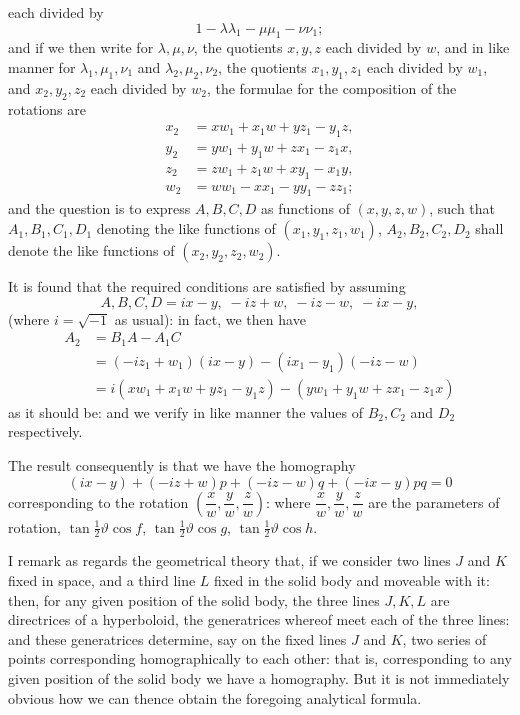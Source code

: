 \documentclass[11pt,a4paper]{article}
\begin{document}

each divided by
\[
1 - \lambda\lambda_{1} - \mu\mu_{1} - \nu\nu_{1};
\]
and if we then write for $\lambda, \mu, \nu$, the quotients $x, y, z$ each divided by $w$, and in like manner for $\lambda_{1}, \mu_{1}, \nu_{1}$ and $\lambda_{2}, \mu_{2}, \nu_{2}$, the quotients $x_{1}, y_{1}, z_{1}$ each divided by $w_{1}$, and $x_{2}, y_{2}, z_{2}$ each divided by $w_{2}$, the formulae for the composition of the rotations are
\[
\begin{aligned}
x_{2} &= xw_{1} + x_{1}w + yz_{1} - y_{1}z,\\
y_{2} &= yw_{1} + y_{1}w + zx_{1} - z_{1}x,\\
z_{2} &= zw_{1} + z_{1}w + xy_{1} - x_{1}y,\\
w_{2} &= ww_{1} - xx_{1} - yy_{1} - zz_{1};
\end{aligned}
\]
and the question is to express $A, B, C, D$ as functions of $(x, y, z, w)$, such that $A_{1}, B_{1}, C_{1}, D_{1}$ denoting the like functions of $(x_{1}, y_{1}, z_{1}, w_{1})$, $A_{2}, B_{2}, C_{2}, D_{2}$ shall denote the like functions of $(x_{2}, y_{2}, z_{2}, w_{2})$.

It is found that the required conditions are satisfied by assuming
\[
A, B, C, D = ix - y,\; -iz + w,\; -iz - w,\; -ix - y,
\]
(where $i = \sqrt{-1}$ as usual): in fact, we then have
\[
\begin{aligned}
A_{2} &= B_{1}A - A_{1}C\\
&= (-iz_{1} + w_{1})(ix - y) - (ix_{1} - y_{1})(-iz - w)\\
&= i(xw_{1} + x_{1}w + yz_{1} - y_{1}z) - (yw_{1} + y_{1}w + zx_{1} - z_{1}x)
\end{aligned}
\]
as it should be: and we verify in like manner the values of $B_{2}, C_{2}$ and $D_{2}$ respectively.

The result consequently is that we have the homography
\[
(ix - y) + (-iz + w)p + (-iz - w)q + (-ix - y)pq = 0
\]
corresponding to the rotation $\left(\dfrac{x}{w}, \dfrac{y}{w}, \dfrac{z}{w}\right)$: where $\dfrac{x}{w}, \dfrac{y}{w}, \dfrac{z}{w}$ are the parameters of rotation, $\tan\tfrac{1}{2}\vartheta \cos f$, $\tan\tfrac{1}{2}\vartheta \cos g$, $\tan\tfrac{1}{2}\vartheta \cos h$.

I remark as regards the geometrical theory that, if we consider two lines $J$ and $K$ fixed in space, and a third line $L$ fixed in the solid body and moveable with it: then, for any given position of the solid body, the three lines $J, K, L$ are directrices of a hyperboloid, the generatrices whereof meet each of the three lines: and these generatrices determine, say on the fixed lines $J$ and $K$, two series of points corresponding homographically to each other: that is, corresponding to any given position of the solid body we have a homography. But it is not immediately obvious how we can thence obtain the foregoing analytical formula.
\end{document}
